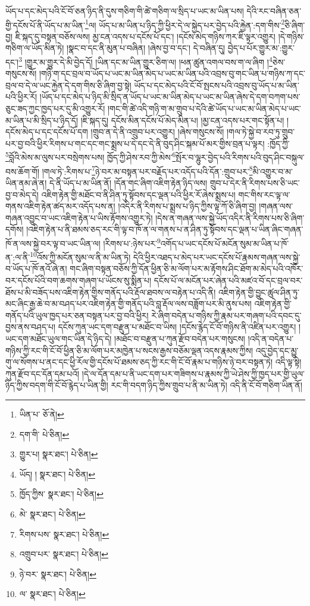 ཡོད་པ་དང་མེད་པའི་ངོ་བོ་ཅན་ཉིད་ནི་དུས་གཅིག་གི་ཚེ་གཅིག་ལ་སྲིད་པ་ཡང་མ་ཡིན་པས། དེའི་རང་བཞིན་ཅན་གྱི་དངོས་པོ་ནི་ཡོད་པ་མ་ཡིན་\footnote{ཡིན་པ་  ཅོ་ནེ། }ལ། ཡོད་པ་མ་ཡིན་པ་ཉིད་ཀྱི་ཕྱིར་དེ་ལ་སྐྱེད་པར་བྱེད་པའི་རྐྱེན་:དག་གིས་\footnote{དག་གི་  པེ་ཅིན། }ཅི་ཞིག་བྱ། ཇི་སྐད་དུ་བསྟན་བཅོས་ལས། མྱ་ངན་འདས་པ་དངོས་པོ་དང་། །དངོས་མེད་གཉིས་ཀར་ཇི་ལྟར་འགྱུར། །དེ་གཉིས་གཅིག་ལ་ཡོད་མིན་ཏེ། །སྣང་བ་དང་ནི་མུན་པ་བཞིན། །ཞེས་བྱ་བ་དང་། དེ་བཞིན་དུ། བྱེད་པ་པོར་གྱུར་མ་:གྱུར་དང་།\footnote{གྱུར་པ།  སྣར་ཐང་།  པེ་ཅིན། } །གྱུར་མ་གྱུར་དེ་མི་བྱེད་དོ། །ཡིན་དང་མ་ཡིན་གྱུར་ཅིག་ལ། །ཕན་ཚུན་འགལ་བས་ག་ལ་ཞིག །\footnote{ཡོད། །  སྣར་ཐང་།  པེ་ཅིན། }ཅེས་གསུངས་སོ། །གཉི་ག་དང་བྲལ་བ་ཡོད་པ་ཡང་མ་ཡིན་མེད་པ་ཡང་མ་ཡིན་པའི་འབྲས་བུ་གང་ཡིན་པ་གཉིས་ཀ་དང་བྲལ་བ་དེ་ལ་ཡང་རྐྱེན་དེ་དག་གིས་ཅི་ཞིག་བྱ་སྟེ། ཡོད་པ་དང་མེད་པའི་ངོ་བོ་སྤངས་པའི་འབྲས་བུ་ཡོད་པ་མ་ཡིན་པའི་ཕྱིར་རོ། །ཡོད་པ་དང་མེད་པ་ཉིད་མི་སྲིད་ན་ཡོད་པ་ཡང་མ་ཡིན་མེད་པ་ཡང་མ་ཡིན་ཞེས་དེ་དག་བཀག་པས་ཅུང་ཟད་ཀྱང་ཁྱད་པར་དུ་མི་འགྱུར་རོ། །གང་གི་ཚེ་འདི་གཉི་ག་མ་གྲུབ་པ་དེའི་ཚེ་ཡོད་པ་ཡང་མ་ཡིན་མེད་པ་ཡང་མ་ཡིན་པ་མི་སྲིད་པ་ཉིད་དོ། །ཇི་སྐད་དུ། དངོས་མིན་དངོས་པོ་མེད་མིན་པ། །མྱ་ངན་འདས་པར་གང་སྟོན་པ། །དངོས་མེད་པ་དང་དངོས་པོ་དག །གྲུབ་ན་དེ་ནི་འགྲུབ་པར་འགྱུར། །ཞེས་གསུངས་སོ། །གལ་ཏེ་སྐྱེ་བ་རབ་ཏུ་གྲུབ་པར་བྱ་བའི་ཕྱིར་རིགས་པ་གང་དང་གང་སྨྲས་པ་དེ་དང་དེ་ནི་བུད་ཤིང་སྐམ་པོ་མར་གྱིས་བྲན་པ་ལྟར། :ཁྱོད་ཀྱི་\footnote{ཁྱོད་ཀྱིས་  སྣར་ཐང་།  པེ་ཅིན། }བློའི་མེས་མ་ལུས་པར་བསྲེགས་པས། ཁྱོད་ཀྱི་ཤེས་རབ་ཀྱི་མེས་\footnote{མེ་  སྣར་ཐང་།  པེ་ཅིན། }སྤོར་བ་ལྷུར་བྱེད་པའི་རིགས་པའི་བུད་ཤིང་བསྐུལ་བས་ཆོག་གོ། །གལ་ཏེ་:རིགས་པ་\footnote{རིགས་པས་  སྣར་ཐང་།  པེ་ཅིན། }ཉེ་བར་མ་བསྟན་པར་བརྗོད་པར་འདོད་པའི་དོན་:གྲུབ་པར་\footnote{འགྲུབ་པར་  སྣར་ཐང་།  པེ་ཅིན། }མི་འགྱུར་བ་མ་ཡིན་ནམ་ཞེ་ན། དེ་ནི་ཡོད་པ་མ་ཡིན་ནོ། །དོན་གང་ཞིག་འཇིག་རྟེན་ཉིད་ལས། གྲུབ་པ་དེར་ནི་རིགས་པས་ཅི་ཡང་བྱ་བ་མེད་དེ། འཇིག་རྟེན་གྱི་མཐོང་བ་ནི་ཤིན་ཏུ་སྟོབས་དང་ལྡན་པའི་ཕྱིར་རོ་ཞེས་སྨྲས་པ། གང་གིས་རང་ལྟ་ལ་གནས་འཇིག་རྟེན་ཚད་མར་འདོད་པས་ན། །འདིར་ནི་རིགས་པ་སྨྲས་པ་ཉིད་ཀྱིས་ལྟ་ཀོ་ཅི་ཞིག་བྱ། །གཞན་ལས་གཞན་འབྱུང་བ་ཡང་འཇིག་རྟེན་པ་ཡིས་རྟོགས་འགྱུར་ཏེ། །དེས་ན་གཞན་ལས་སྐྱེ་ཡོད་འདིར་ནི་རིགས་པས་ཅི་ཞིག་དགོས། །འཇིག་རྟེན་པ་ནི་ཐམས་ཅད་རང་གི་ལྟ་བ་ཁོ་ན་ལ་གནས་པ་ན་ཤིན་ཏུ་སྟོབས་དང་ལྡན་པ་ཡིན་ཞིང་གཞན་ཁོ་ན་ལས་སྐྱེ་བར་ལྟ་བ་ཡང་ཡིན་ལ། །རིགས་པ་:ཉེས་པར་\footnote{ཉེ་བར་  སྣར་ཐང་།  པེ་ཅིན། }འགོད་པ་ཡང་དངོས་པོ་མངོན་སུམ་མ་ཡིན་པ་ཁོ་ན་:ལ་ནི་\footnote{ལ་  སྣར་ཐང་།  པེ་ཅིན། }འོས་ཀྱི་མངོན་སུམ་ལ་ནི་མ་ཡིན་ཏེ། དེའི་ཕྱིར་འཐད་པ་མེད་པར་ཡང་དངོས་པོ་རྣམས་གཞན་ལས་སྐྱེ་བ་ཡོད་པ་ཁོ་ནའོ་ཞེ་ན། གང་ཞིག་བསྟན་བཅོས་ཀྱི་དོན་ཕྱིན་ཅི་མ་ལོག་པར་མ་རྟོགས་ཤིང་ཐོག་མ་མེད་པའི་འཁོར་བར་དངོས་པོའི་བག་ཆགས་གཞག་པ་ཡོངས་སུ་སྨིན་པ། དངོས་པོ་ལ་མངོན་པར་ཞེན་པའི་མཛའ་བོ་དང་བྲལ་བར་ཐོས་པ་མི་བཟོད་པས་འཇིག་རྟེན་གྱིས་གནོད་པའི་རྡོལ་ཐབས་ལ་བརྟེན་པ་འདི་ནི། འཇིག་རྟེན་གྱི་བྱུང་ཚུལ་ཤིན་ཏུ་མང་ཞིང་རྒྱ་ཆེ་བ་མ་བཤད་པར་འཇིག་རྟེན་གྱི་གནོད་པའི་བླ་རྡོལ་ལས་བཟློག་པར་མི་ནུས་པས། འཇིག་རྟེན་གྱི་གནོད་པའི་ཡུལ་ཁྱད་པར་ཅན་བསྟན་པར་བྱ་བའི་ཕྱིར། རེ་ཞིག་བདེན་པ་གཉིས་ཀྱི་རྣམ་པར་གཞག་པའི་དབང་དུ་བྱས་ནས་བཤད་པ། དངོས་ཀུན་ཡང་དག་བརྫུན་པ་མཐོང་བ་ཡིས། །དངོས་རྙེད་ངོ་བོ་གཉིས་ནི་འཛིན་པར་འགྱུར། །ཡང་དག་མཐོང་ཡུལ་གང་ཡིན་དེ་ཉིད་དེ། །མཐོང་བ་བརྫུན་པ་ཀུན་རྫོབ་བདེན་པར་གསུངས། །འདི་ན་བདེན་པ་གཉིས་ཀྱི་རང་གི་ངོ་བོ་ཕྱིན་ཅི་མ་ལོག་པར་མཁྱེན་པ་སངས་རྒྱས་བཅོམ་ལྡན་འདས་རྣམས་ཀྱིས། འདུ་བྱེད་དང་མྱུ་གུ་ལ་སོགས་པ་ནང་དང་ཕྱི་རོལ་གྱི་དངོས་པོ་ཐམས་ཅད་ཀྱི་རང་གི་ངོ་བོ་རྣམ་པ་གཉིས་ཉེ་བར་བསྟན་ཏེ། འདི་ལྟ་སྟེ། ཀུན་རྫོབ་དང་དོན་དམ་པའོ། །དེ་ལ་དོན་དམ་པ་ནི་ཡང་དག་པར་གཟིགས་པ་རྣམས་ཀྱི་ཡེ་ཤེས་ཀྱི་ཁྱད་པར་གྱི་ཡུལ་ཉིད་ཀྱིས་བདག་གི་ངོ་བོ་རྙེད་པ་ཡིན་གྱི། རང་གི་བདག་ཉིད་ཀྱིས་གྲུབ་པ་ནི་མ་ཡིན་ཏེ། འདི་ནི་ངོ་བོ་གཅིག་ཡིན་ནོ། 